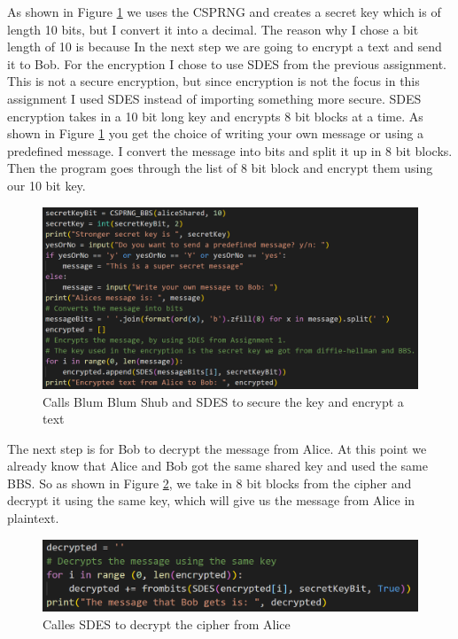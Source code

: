\documentclass[12pt, letterpaper]{article}
\begin{document}
As shown in Figure \ref{fig:step6} we uses the CSPRNG and creates a secret key which is of length 10 bits, but I convert it into a decimal. The reason why I chose a bit length of 10 is because In the next step we are going to encrypt a text and send it to Bob. For the encryption I chose to use SDES from the previous assignment. This is not a secure encryption, but since encryption is not the focus in this assignment I used SDES instead of importing something more secure. SDES encryption takes in a 10 bit long key and encrypts 8 bit blocks at a time. As shown in Figure \ref{fig:step6} you get the choice of writing your own message or using a predefined message. I convert the message into bits and split it up in 8 bit blocks. Then the program goes through the list of 8 bit block and encrypt them using our 10 bit key.

\begin{figure}[H]
  \includegraphics[width=\linewidth]{code_snippets/step6.PNG}
  \caption{Calls Blum Blum Shub and SDES to secure the key and encrypt a text}
  \label{fig:step6}
\end{figure}

The next step is for Bob to decrypt the message from Alice. At this point we already know that Alice and Bob got the same shared key and used the same BBS. So as shown in Figure \ref{fig:step7}, we take in 8 bit blocks from the cipher and decrypt it using the same key, which will give us the message from Alice in plaintext.

\begin{figure}[H]
  \includegraphics[width=\linewidth]{code_snippets/step7.PNG}
  \caption{Calles SDES to decrypt the cipher from Alice}
  \label{fig:step7}
\end{figure}
\end{document}
